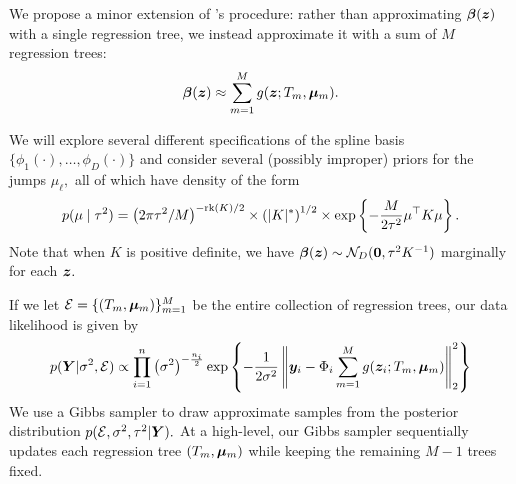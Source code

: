 We propose a minor extension of \citet{Low-Kamn2015}'s procedure: rather than approximating $\boldsymbol{\beta}(\bm{z})$ with a single regression tree, we instead approximate it with a sum of $M$ regression trees:
$$
\boldsymbol{\beta}(\bm{z}) \approx \sum_{m = 1}^{M}{g(\bm{z}; T_{m}, \boldsymbol{\mu}_{m})}.
$$

We will explore several different specifications of the spline basis $\{\phi_{1}(\cdot), \ldots, \phi_{D}(\cdot)\}$ and consider several (possibly improper) priors for the jumps $\mu_{\ell},$ all of which have density of the form
$$
p(\mu \mid \tau^{2}) = \left(2\pi\tau^{2}/M\right)^{-\text{rk}(K)/2} \times \left(\lvert K \rvert^{*}\right)^{1/2} \times\exp\left\{-\frac{M}{2\tau^{2}}\mu^{\top}K\mu\right\}.
$$
Note that when $K$ is positive definite, we have $\boldsymbol{\beta}(\bm{z}) \sim \mathcal{N}_{D}(\mathbf{0}, \tau^{2}K^{-1})$ marginally for each $\bm{z}.$

If we let $\mathcal{E} = \{(T_{m}, \boldsymbol{\mu}_{m})\}_{m = 1}^{M}$ be the entire collection of regression trees, our data likelihood is given by
\begin{equation}
\label{eq:likelihood}
p(\bm{Y} \vert \sigma^{2}, \mathcal{E}) \propto \prod_{i = 1}^{n}{\left(\sigma^{2}\right)^{-\frac{n_{i}}{2}}\exp\left\{-\frac{1}{2\sigma^{2}}\left\lVert \bm{y}_{i} - \Phi_{i}\sum_{m = 1}^{M}{g(\bm{z}_{i};T_{m}, \boldsymbol{\mu}_{m})}\right\rVert_{2}^{2}\right\}}
\end{equation}
We use a Gibbs sampler to draw approximate samples from the posterior distribution $p(\mathcal{E}, \sigma^{2}, \tau^{2} \vert \bm{Y}).$
At a high-level, our Gibbs sampler sequentially updates each regression tree $(T_{m}, \boldsymbol{\mu}_{m})$ while keeping the remaining $M-1$ trees fixed.





